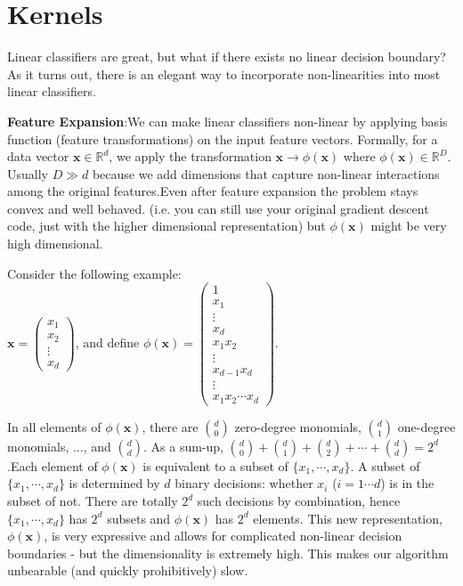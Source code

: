 \documentclass[12pt]{article}
\begin{document}
 
 
 
 
 
 
 
 \section{Kernels}
 
 Linear classifiers are great, but what if there exists no linear decision boundary? As it turns out, there is an elegant way to incorporate non-linearities into most linear classifiers.
 
 
 \textbf{ Feature Expansion}:We can make linear classifiers non-linear by applying basis function (feature transformations) on the input feature vectors. Formally, for a data vector $\mathbf{x}\in\mathbb{R}^d$, we apply the transformation $\mathbf{x} \rightarrow \phi(\mathbf{x})$ where $\phi(\mathbf{x})\in\mathbb{R}^D$. Usually $D \gg d$ because we add dimensions that capture non-linear interactions among the original features.Even after feature expansion the problem stays convex and well behaved. (i.e. you can still use your original gradient descent code, just with the higher dimensional representation) but $\phi(\mathbf{x})$ might be very high dimensional. 
 
 Consider the following example: \\ $\mathbf{x}=\begin{pmatrix}x_1\\ x_2\\ \vdots \\ x_d \end{pmatrix}$, and define $\phi(\mathbf{x})=\begin{pmatrix}1\\ x_1\\ \vdots \\x_d \\ x_1x_2 \\ \vdots \\ x_{d-1}x_d\\ \vdots \\x_1x_2\cdots x_d \end{pmatrix}$.
 
In all elements of $\phi(\mathbf{x})$, there are ${d \choose 0}$ zero-degree monomials, ${d \choose 1}$ one-degree monomials, ..., and ${d \choose d}$. As a sum-up, ${d \choose 0} +  {d \choose 1} +  {d \choose 2} + \cdots +  {d \choose d} =2^d$.Each element of $\phi(\mathbf{x})$ is equivalent to a subset of $\{x_1,\cdots,x_d\}$. A subset of $\{x_1,\cdots,x_d\}$ is determined by $d$ binary decisions: whether $x_i$ ($i=1\cdots d$) is in the subset of not. There are totally $2^d$ such decisions by combination, hence $\{x_1,\cdots,x_d\}$ has $2^d$ subsets and $\phi(\mathbf{x})$ has $2^d$ elements.
This new representation, $\phi(\mathbf{x})$, is very expressive and allows for complicated non-linear decision boundaries - but the dimensionality is extremely high. This makes our algorithm unbearable (and quickly prohibitively) slow.
 
\end{document}
